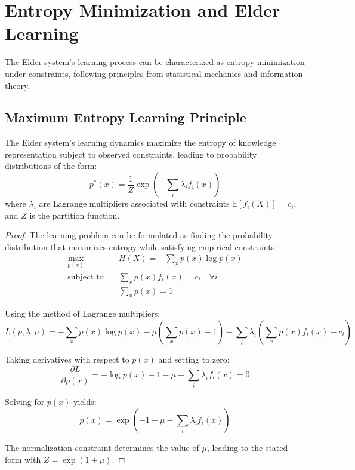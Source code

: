 \section{Entropy Minimization and Elder Learning}

The Elder system's learning process can be characterized as entropy minimization under constraints, following principles from statistical mechanics and information theory.

\subsection{Maximum Entropy Learning Principle}

\begin{theorem}
The Elder system's learning dynamics maximize the entropy of knowledge representation subject to observed constraints, leading to probability distributions of the form:
\begin{equation}
p^*(x) = \frac{1}{Z} \exp\left(-\sum_i \lambda_i f_i(x)\right)
\end{equation}
where $\lambda_i$ are Lagrange multipliers associated with constraints $\mathbb{E}[f_i(X)] = c_i$, and $Z$ is the partition function.
\end{theorem}

\begin{proof}
The learning problem can be formulated as finding the probability distribution that maximizes entropy while satisfying empirical constraints:
\begin{align}
\max_{p(x)} \quad & H(X) = -\sum_x p(x) \log p(x) \\
\text{subject to} \quad & \sum_x p(x) f_i(x) = c_i \quad \forall i \\
& \sum_x p(x) = 1
\end{align}

Using the method of Lagrange multipliers:
\begin{equation}
L(p, \lambda, \mu) = -\sum_x p(x) \log p(x) - \mu\left(\sum_x p(x) - 1\right) - \sum_i \lambda_i\left(\sum_x p(x) f_i(x) - c_i\right)
\end{equation}

Taking derivatives with respect to $p(x)$ and setting to zero:
\begin{equation}
\frac{\partial L}{\partial p(x)} = -\log p(x) - 1 - \mu - \sum_i \lambda_i f_i(x) = 0
\end{equation}

Solving for $p(x)$ yields:
\begin{equation}
p(x) = \exp\left(-1 - \mu - \sum_i \lambda_i f_i(x)\right)
\end{equation}

The normalization constraint determines the value of $\mu$, leading to the stated form with $Z = \exp(1 + \mu)$.
\end{proof}


